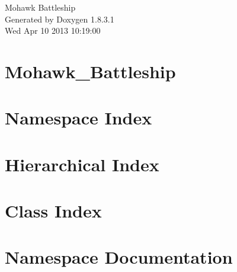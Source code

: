 \documentclass{book}
\begin{document}
\hypersetup{pageanchor=false,citecolor=blue}
\begin{titlepage}
\vspace*{7cm}
\begin{center}
{\Large Mohawk Battleship }\\
\vspace*{1cm}
{\large Generated by Doxygen 1.8.3.1}\\
\vspace*{0.5cm}
{\small Wed Apr 10 2013 10:19:00}\\
\end{center}
\end{titlepage}
\clearemptydoublepage
{}
\tableofcontents
\clearemptydoublepage
{}
\hypersetup{pageanchor=true,citecolor=blue}
\chapter{Mohawk\-\_\-\-Battleship}
\label{md_README}
\hypertarget{md_README}{}

\chapter{Namespace Index}

\chapter{Hierarchical Index}

\chapter{Class Index}

\chapter{Namespace Documentation}













\end{document}
